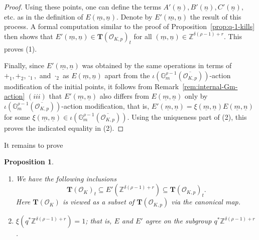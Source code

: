 \documentclass[11pt,oneside]{amsart}
\theoremstyle{plain}
\newtheorem{proposition}[theorem]{Proposition}
\theoremstyle{definition}
\def\G{{\bf G}}
\def\TT{\mathbf{T}}
\def\Z{\mathbb{Z}}
\def\G{\mathbb{G}}
\def\oh{\mathcal{O}}
\begin{document}
\begin{proof}
Using these points, one can define the terms $A'(\underline{n}), B'(\underline{n}), C'(\underline{n}),$ etc. as in the definition of $E(\underline{m}, \underline{n})$. Denote by $E'(\underline{m}, \underline{n})$ the result of this process. A formal computation similar to the proof of Proposition~\ref{prop:q-1-kills} then shows that $E'(\underline{m}, \underline{n}) \in \TT(\oh_{K, p})_{t}$ for all $(\underline{m},\underline{n}) \in \Z^{\delta(\rho-1)+r}$. This proves (1). 

Finally, since $E'(\underline{m}, \underline{n})$ was obtained by the same operations in terms of $+_1, +_2, \cdot_1,$ and $\cdot_2$ as $E(\underline{m}, \underline{n})$ apart from the $\iota(\G_m^{\rho-1}(\overline{\oh_{K, p}}))$-action modification of the initial points, it follows from Remark~\ref{rem:internal-Gm-action} $(iii)$ that $E'(\underline{m}, \underline{n})$ also differs from $E(\underline{m}, \underline{n})$ only by  $\iota(\G_m^{\rho-1}(\overline{\oh_{K, p}}))$-action modification, that is, $E'(\underline{m}, \underline{n})=\xi(\underline{m}, \underline{n})E(\underline{m}, \underline{n})$
for some $\xi(\underline{m}, \underline{n}) \in \iota(\G_m^{\rho-1}(\overline{\oh_{K, p}}))$. Using the uniqueness part of (2), this proves the indicated equality in (2).
\end{proof}

It remains to prove
\begin{proposition} \label{prop:modify-E-by-local-units2}
\begin{enumerate}
\item We have the following inclusions 
$$\TT(\oh_K)_t \subseteq E'(\Z^{\delta(\rho-1)+r}) \subseteq \TT(\oh_{K, p})_t.$$
Here $\TT(\oh_K)$ is viewed as a subset of $\TT(\oh_{K, p})$ via the canonical map.  
\item $\xi(q^*\Z^{\delta(\rho-1)+r})=1$; that is, $E$ and $E'$ agree on the subgroup $q^*\Z^{\delta(\rho-1)+r}$. 
\end{enumerate}
\end{proposition}
\end{document}
